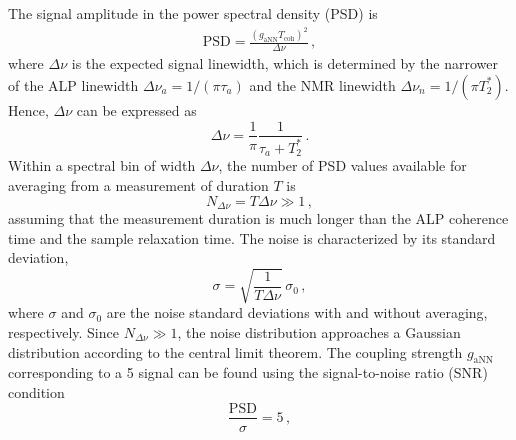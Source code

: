 The signal amplitude in the power spectral density (PSD) is
\begin{align}
    \mathrm{PSD} = \frac{\left(g_{\mathrm{aNN}} T_\mathrm{coh}\right)^2}{\Delta\nu}
    \,,
    \label{eq:S_PSD}
\end{align}
where $\Delta\nu$ is the expected signal linewidth, which is determined by the narrower of the ALP linewidth $\Delta\nu_a = 1/(\pi \tau_a)$ and the NMR linewidth $\Delta\nu_n = 1/(\pi T_2^*)$.
Hence, $\Delta\nu$ can be expressed as
\begin{equation}
    \Delta\nu = \frac{1}{\pi} \frac{1}{\tau_a + T_2^*}
    \,.\label{eq:Gamma_signal}
\end{equation}
Within a spectral bin of width $\Delta\nu$, the number of PSD values available for averaging from a measurement of duration $T$ is
\begin{equation}
    N_{\Delta\nu} = T \Delta\nu \gg 1
    \,,\label{eq:NGamma}
\end{equation}
assuming that the measurement duration is much longer than the ALP coherence time and the sample relaxation time.
The noise is characterized by its standard deviation,
\begin{equation}
    \sigma = \sqrt{\frac{1}{T \Delta\nu}}\,\sigma_{0}
    \,,\label{eq:sigma}
\end{equation}
where $\sigma$ and $\sigma_{0}$ are the noise standard deviations with and without averaging, respectively.
Since $N_{\Delta\nu} \gg 1$, the noise distribution approaches a Gaussian distribution according to the central limit theorem.
The coupling strength $g_{\mathrm{aNN}}$ corresponding to a \SI{5}{\sigma} signal can be found using the signal-to-noise ratio (SNR) condition
\begin{equation}
    \frac{\mathrm{PSD}}{\sigma} = 5
    \,, \label{eq:SNR_condition}
\end{equation}
